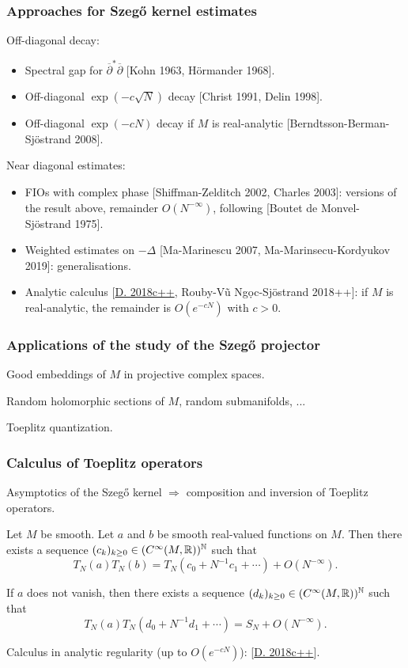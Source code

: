 \documentclass[mathserif]{beamer}
\newcommand{\mycite}[1]{{\color{mygreen} \small #1}}
\begin{document}
\begin{frame}
  \frametitle{Approaches for Szeg\H{o} kernel estimates}
  Off-diagonal decay:
  \begin{itemize}
  \item Spectral gap for $\overline{\partial}^*\overline{\partial}$
    \mycite{[Kohn 1963, Hörmander 1968]}.
  \item Off-diagonal $\exp(-c\sqrt{N})$ decay \mycite{[Christ 1991,
      Delin 1998]}.
  \item Off-diagonal $\exp(-cN)$ decay if $M$ is {\color{myorange} real-analytic}
    \mycite{[Berndtsson-Berman-Sjöstrand 2008]}.
  \end{itemize}

  Near diagonal estimates:
  \begin{itemize}
    \item FIOs with complex phase \mycite{[Shiffman-Zelditch 2002,
        Charles 2003]}: versions of
      the result above, remainder $O(N^{-\infty})$, following
      \mycite{[Boutet de Monvel-Sjöstrand 1975]}.
    \item Weighted estimates on $-\Delta$
      \mycite{[Ma-Marinescu 2007, Ma-Marinsecu-Kordyukov 2019]}:
      generalisations.
    \item Analytic calculus \mycite{[\underline{D. 2018c++},
        Rouby-Vũ Ng\d{o}c-Sjöstrand 2018++]}: if $M$ is
      {\color{myorange} real-analytic},
      the remainder is $O(e^{-cN})$ with $c>0$.
    \end{itemize}
  \end{frame}

  \begin{frame}
    \frametitle{Applications of the study of the Szeg\H{o} projector}
    Good embeddings of $M$ in projective complex spaces.

    \vfill

    Random holomorphic sections of $M$, random submanifolds, ...

    \vfill

    Toeplitz quantization.
  \end{frame}

  \begin{frame}
    \frametitle{Calculus of Toeplitz operators}
    Asymptotics of the Szeg\H{o} kernel $\Rightarrow$ composition and
    inversion of Toeplitz operators.

    \begin{theorem}[{\mycite{[Schlichenmaier 1999]}}]Let $M$ be smooth. Let $a$ and $b$ be
      smooth real-valued functions on $M$. Then there exists a sequence $(c_k)_{k\geq
        0}\in (C^{\infty}(M,\mathbb{R}))^{\mathbb{N}}$ such that
      \[
        T_N(a)T_N(b)=T_N(c_0+N^{-1}c_1+\cdots)+O(N^{-\infty}).
        \]

        If $a$ does not vanish, then there exists a sequence
        $(d_k)_{k\geq 0}\in (C^{\infty}(M,\mathbb{R}))^{\mathbb{N}}$ such that
        \[
          T_N(a)T_N(d_0+N^{-1}d_1+\cdots)=S_N+O(N^{-\infty}).
          \]
        \end{theorem}
        Calculus in analytic regularity (up to $O(e^{-cN})$):
        \mycite{[\underline{D. 2018c++}]}.
  \end{frame}
\end{document}
